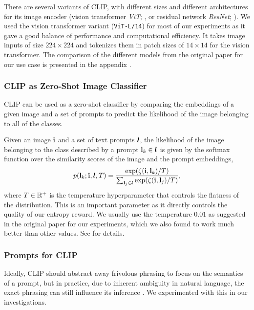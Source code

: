 There are several variants of CLIP, with different sizes and different architectures for its image encoder (vision transformer \emph{ViT}; \cite{vit}, or residual network \emph{ResNet}; \cite{resnet}).
We used the vision transformer variant (\texttt{ViT-L/14}) for most of our experiments as it gave a good balance of performance and computational efficiency.
It takes image inputs of size \(224 \times 224\) and tokenizes them in patch sizes of \(14 \times 14\) for the vision transformer.
The comparison of the different models from the original paper for our use case is presented in the appendix .

\subsubsection{CLIP as Zero-Shot Image Classifier}
\label{sec:clip-classifier}
CLIP can be used as a zero-shot classifier by comparing the embeddings of a given image and a set of prompts to predict the likelihood of the image belonging to all of the classes.

Given an image \(\mathbf{i}\) and a set of text prompts \(\bm{l}\), the likelihood of the image belonging to the class described by a prompt \(\mathbf{l}_k \in \bm{l}\) is given by the softmax function over the similarity scores of the image and the prompt embeddings,
\begin{equation}
    \label{eq:clip-dist}
    p(\mathbf{l}_k; \mathbf{i}, \bm{l}, T) = \dfrac{\exp(\zeta(\mathbf{i}, \mathbf{l}_k)/T)}{\sum_{\mathbf{l}_j \in \bm{l}} \exp(\zeta(\mathbf{i}, \mathbf{l}_j)/T)},
\end{equation}
where \(T \in \mathbb{R}^+\) is the temperature hyperparameter that controls the flatness of the distribution.
This is an important parameter as it directly controls the quality of our entropy reward.
We usually use the temperature \(0.01\) as suggested in the original paper for our experiments, which we also found to work much better than other values.
See  for details.

\subsubsection{Prompts for CLIP}
\label{sec:prompt-engineering}
Ideally, CLIP should abstract away frivolous phrasing to focus on the semantics of a prompt, but in practice, due to inherent ambiguity in natural language, the exact phrasing can still influence its inference \citep{waffleclip}. 
We experimented with this in our investigations.

